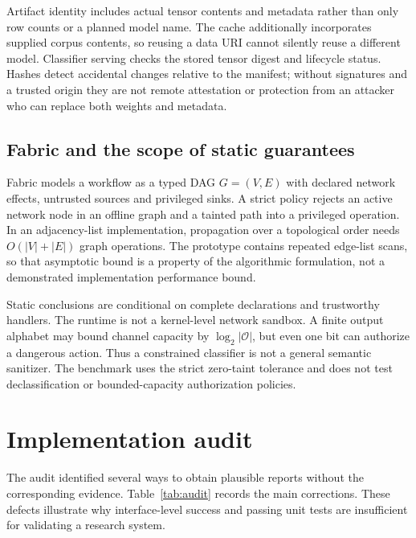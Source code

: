 \documentclass[11pt,a4paper]{article}
\begin{document}
Artifact identity includes actual tensor contents and metadata rather than only
row counts or a planned model name. The cache additionally incorporates supplied
corpus contents, so reusing a data URI cannot silently reuse a different model.
Classifier serving checks the stored tensor digest and lifecycle status. Hashes
detect accidental changes relative to the manifest; without signatures and a
trusted origin they are not remote attestation or protection from an attacker
who can replace both weights and metadata.

\subsection{Fabric and the scope of static guarantees}
Fabric models a workflow as a typed DAG $G=(V,E)$ with declared network effects,
untrusted sources and privileged sinks. A strict policy rejects an active
network node in an offline graph and a tainted path into a privileged operation.
In an adjacency-list implementation, propagation over a topological order needs
$O(|V|+|E|)$ graph operations. The prototype contains repeated edge-list scans,
so that asymptotic bound is a property of the algorithmic formulation, not a
demonstrated implementation performance bound.

Static conclusions are conditional on complete declarations and trustworthy
handlers. The runtime is not a kernel-level network sandbox. A finite output
alphabet may bound channel capacity by $\log_2|\mathcal{O}|$, but even one bit
can authorize a dangerous action. Thus a constrained classifier is not a general
semantic sanitizer. The benchmark uses the strict zero-taint tolerance and does
not test declassification or bounded-capacity authorization policies.

\section{Implementation audit}
The audit identified several ways to obtain plausible reports without the
corresponding evidence. Table~\ref{tab:audit} records the main corrections.
These defects illustrate why interface-level success and passing unit tests are
insufficient for validating a research system.
\end{document}
